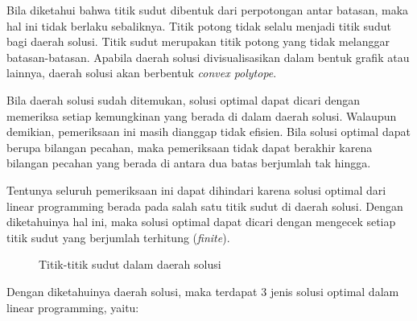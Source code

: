 Bila diketahui bahwa titik sudut dibentuk dari perpotongan antar batasan, maka hal ini tidak berlaku sebaliknya. Titik potong tidak selalu menjadi titik sudut bagi daerah solusi. Titik sudut merupakan titik potong yang tidak melanggar batasan-batasan. Apabila daerah solusi divisualisasikan dalam bentuk grafik atau lainnya, daerah solusi akan berbentuk \textit{convex polytope}.

Bila daerah solusi sudah ditemukan, solusi optimal dapat dicari dengan memeriksa setiap kemungkinan yang berada di dalam daerah solusi. Walaupun demikian, pemeriksaan ini masih dianggap tidak efisien. Bila solusi optimal dapat berupa bilangan pecahan, maka pemeriksaan tidak dapat berakhir karena bilangan pecahan yang berada di antara dua batas berjumlah tak hingga.

Tentunya seluruh pemeriksaan ini dapat dihindari karena solusi optimal dari linear programming berada pada salah satu titik sudut di daerah solusi. Dengan diketahuinya hal ini, maka solusi optimal dapat dicari dengan mengecek setiap titik sudut yang berjumlah terhitung (\textit{finite}).

\begin{figure}[H]
	\centering
	\caption{Titik-titik sudut dalam daerah solusi}
\end{figure}

Dengan diketahuinya daerah solusi, maka terdapat 3 jenis solusi optimal dalam linear programming, yaitu:

